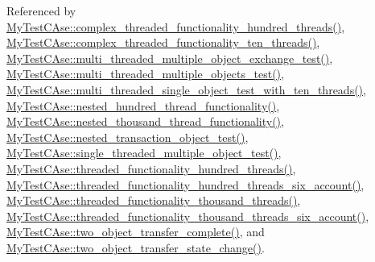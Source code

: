 Referenced by \hyperlink{_my_test_c_ase_8cpp_source_l00412}{My\+Test\+C\+Ase\+::complex\+\_\+threaded\+\_\+functionality\+\_\+hundred\+\_\+threads()}, \hyperlink{_my_test_c_ase_8cpp_source_l00467}{My\+Test\+C\+Ase\+::complex\+\_\+threaded\+\_\+functionality\+\_\+ten\+\_\+threads()}, \hyperlink{_my_test_c_ase_8cpp_source_l00922}{My\+Test\+C\+Ase\+::multi\+\_\+threaded\+\_\+multiple\+\_\+object\+\_\+exchange\+\_\+test()}, \hyperlink{_my_test_c_ase_8cpp_source_l01040}{My\+Test\+C\+Ase\+::multi\+\_\+threaded\+\_\+multiple\+\_\+objects\+\_\+test()}, \hyperlink{_my_test_c_ase_8cpp_source_l00954}{My\+Test\+C\+Ase\+::multi\+\_\+threaded\+\_\+single\+\_\+object\+\_\+test\+\_\+with\+\_\+ten\+\_\+threads()}, \hyperlink{_my_test_c_ase_8cpp_source_l00680}{My\+Test\+C\+Ase\+::nested\+\_\+hundred\+\_\+thread\+\_\+functionality()}, \hyperlink{_my_test_c_ase_8cpp_source_l00715}{My\+Test\+C\+Ase\+::nested\+\_\+thousand\+\_\+thread\+\_\+functionality()}, \hyperlink{_my_test_c_ase_8cpp_source_l00787}{My\+Test\+C\+Ase\+::nested\+\_\+transaction\+\_\+object\+\_\+test()}, \hyperlink{_my_test_c_ase_8cpp_source_l00983}{My\+Test\+C\+Ase\+::single\+\_\+threaded\+\_\+multiple\+\_\+object\+\_\+test()}, \hyperlink{_my_test_c_ase_8cpp_source_l00523}{My\+Test\+C\+Ase\+::threaded\+\_\+functionality\+\_\+hundred\+\_\+threads()}, \hyperlink{_my_test_c_ase_8cpp_source_l00589}{My\+Test\+C\+Ase\+::threaded\+\_\+functionality\+\_\+hundred\+\_\+threads\+\_\+six\+\_\+account()}, \hyperlink{_my_test_c_ase_8cpp_source_l00556}{My\+Test\+C\+Ase\+::threaded\+\_\+functionality\+\_\+thousand\+\_\+threads()}, \hyperlink{_my_test_c_ase_8cpp_source_l00634}{My\+Test\+C\+Ase\+::threaded\+\_\+functionality\+\_\+thousand\+\_\+threads\+\_\+six\+\_\+account()}, \hyperlink{_my_test_c_ase_8cpp_source_l00748}{My\+Test\+C\+Ase\+::two\+\_\+object\+\_\+transfer\+\_\+complete()}, and \hyperlink{_my_test_c_ase_8cpp_source_l00765}{My\+Test\+C\+Ase\+::two\+\_\+object\+\_\+transfer\+\_\+state\+\_\+change()}.


